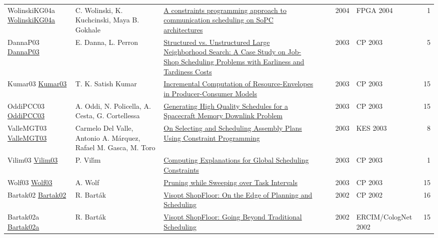 {\begin{longtable}{p{3cm}p{6cm}p{7cm}rrrp{3cm}r}
WolinskiKG04a \href{https://doi.org/10.1145/968280.968336}{WolinskiKG04a} & C. Wolinski, K. Kuchcinski, Maya B. Gokhale & \href{}{A constraints programming approach to communication scheduling on SoPC architectures} &  & \cite{WolinskiKG04a} & 2004 & FPGA 2004 & 1\\
DannaP03 \href{https://doi.org/10.1007/978-3-540-45193-8\_59}{DannaP03} & E. Danna, L. Perron & \href{papers/DannaP03.pdf}{Structured vs. Unstructured Large Neighborhood Search: {A} Case Study on Job-Shop Scheduling Problems with Earliness and Tardiness Costs} &  & \cite{DannaP03} & 2003 & CP 2003 & 5\\
Kumar03 \href{https://doi.org/10.1007/978-3-540-45193-8\_45}{Kumar03} & T. K. Satish Kumar & \href{papers/Kumar03.pdf}{Incremental Computation of Resource-Envelopes in Producer-Consumer Models} &  & \cite{Kumar03} & 2003 & CP 2003 & 15\\
OddiPCC03 \href{https://doi.org/10.1007/978-3-540-45193-8\_39}{OddiPCC03} & A. Oddi, N. Policella, A. Cesta, G. Cortellessa & \href{papers/OddiPCC03.pdf}{Generating High Quality Schedules for a Spacecraft Memory Downlink Problem} &  & \cite{OddiPCC03} & 2003 & CP 2003 & 15\\
ValleMGT03 \href{https://doi.org/10.1007/978-3-540-45226-3\_180}{ValleMGT03} & Carmelo Del Valle, Antonio A. M{\'{a}}rquez, Rafael M. Gasca, M. Toro & \href{papers/ValleMGT03.pdf}{On Selecting and Scheduling Assembly Plans Using Constraint Programming} &  & \cite{ValleMGT03} & 2003 & KES 2003 & 8\\
Vilim03 \href{https://doi.org/10.1007/978-3-540-45193-8\_124}{Vilim03} & P. Vil{\'{\i}}m & \href{papers/Vilim03.pdf}{Computing Explanations for Global Scheduling Constraints} &  & \cite{Vilim03} & 2003 & CP 2003 & 1\\
Wolf03 \href{https://doi.org/10.1007/978-3-540-45193-8\_50}{Wolf03} & A. Wolf & \href{papers/Wolf03.pdf}{Pruning while Sweeping over Task Intervals} &  & \cite{Wolf03} & 2003 & CP 2003 & 15\\
Bartak02 \href{https://doi.org/10.1007/3-540-46135-3\_39}{Bartak02} & R. Bart{\'{a}}k & \href{papers/Bartak02.pdf}{Visopt ShopFloor: On the Edge of Planning and Scheduling} &  & \cite{Bartak02} & 2002 & CP 2002 & 16\\
Bartak02a \href{https://doi.org/10.1007/3-540-36607-5\_14}{Bartak02a} & R. Bart{\'{a}}k & \href{papers/Bartak02a.pdf}{Visopt ShopFloor: Going Beyond Traditional Scheduling} &  & \cite{Bartak02a} & 2002 & ERCIM/CologNet 2002 & 15\\

\end{longtable}}
